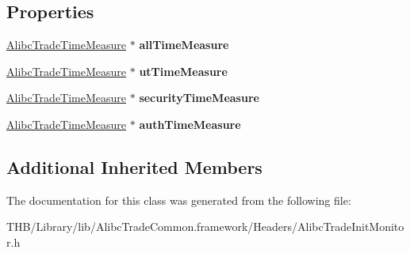 \subsection*{Properties}
\begin{DoxyCompactItemize}
\item 
\mbox{\label{interface_alibc_trade_init_monitor_a2d48b6e739d9a32c55470fe6119631cc}} 
\mbox{\hyperlink{interface_alibc_trade_time_measure}{Alibc\+Trade\+Time\+Measure}} $\ast$ {\bfseries all\+Time\+Measure}
\item 
\mbox{\label{interface_alibc_trade_init_monitor_a5f60f07172552645dcc954ef7eb5b733}} 
\mbox{\hyperlink{interface_alibc_trade_time_measure}{Alibc\+Trade\+Time\+Measure}} $\ast$ {\bfseries ut\+Time\+Measure}
\item 
\mbox{\label{interface_alibc_trade_init_monitor_a8254a499d7caa83febe3816c6f9b04d2}} 
\mbox{\hyperlink{interface_alibc_trade_time_measure}{Alibc\+Trade\+Time\+Measure}} $\ast$ {\bfseries security\+Time\+Measure}
\item 
\mbox{\label{interface_alibc_trade_init_monitor_a4287200dc9e3741ba7b6e46f967373f5}} 
\mbox{\hyperlink{interface_alibc_trade_time_measure}{Alibc\+Trade\+Time\+Measure}} $\ast$ {\bfseries auth\+Time\+Measure}
\end{DoxyCompactItemize}
\subsection*{Additional Inherited Members}


The documentation for this class was generated from the following file\+:\begin{DoxyCompactItemize}
\item 
T\+H\+B/\+Library/lib/\+Alibc\+Trade\+Common.\+framework/\+Headers/Alibc\+Trade\+Init\+Monitor.\+h\end{DoxyCompactItemize}
